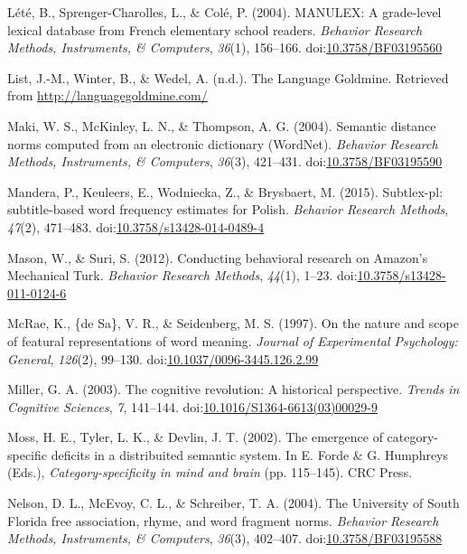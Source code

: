 \documentclass[english,,man]{apa6}
\theoremstyle{definition}
\theoremstyle{definition}
\theoremstyle{definition}
\theoremstyle{remark}
\begin{document}
\leavevmode\hypertarget{ref-Lete2004}{}%
Lété, B., Sprenger-Charolles, L., \& Colé, P. (2004). MANULEX: A
grade-level lexical database from French elementary school readers.
\emph{Behavior Research Methods, Instruments, \& Computers},
\emph{36}(1), 156--166.
doi:\href{https://doi.org/10.3758/BF03195560}{10.3758/BF03195560}

\leavevmode\hypertarget{ref-List}{}%
List, J.-M., Winter, B., \& Wedel, A. (n.d.). The Language Goldmine.
Retrieved from \url{http://languagegoldmine.com/}

\leavevmode\hypertarget{ref-Maki2004}{}%
Maki, W. S., McKinley, L. N., \& Thompson, A. G. (2004). Semantic
distance norms computed from an electronic dictionary (WordNet).
\emph{Behavior Research Methods, Instruments, \& Computers},
\emph{36}(3), 421--431.
doi:\href{https://doi.org/10.3758/BF03195590}{10.3758/BF03195590}

\leavevmode\hypertarget{ref-Mandera2015}{}%
Mandera, P., Keuleers, E., Wodniecka, Z., \& Brysbaert, M. (2015).
Subtlex-pl: subtitle-based word frequency estimates for Polish.
\emph{Behavior Research Methods}, \emph{47}(2), 471--483.
doi:\href{https://doi.org/10.3758/s13428-014-0489-4}{10.3758/s13428-014-0489-4}

\leavevmode\hypertarget{ref-Mason2012}{}%
Mason, W., \& Suri, S. (2012). Conducting behavioral research on
Amazon's Mechanical Turk. \emph{Behavior Research Methods},
\emph{44}(1), 1--23.
doi:\href{https://doi.org/10.3758/s13428-011-0124-6}{10.3758/s13428-011-0124-6}

\leavevmode\hypertarget{ref-McRae1997}{}%
McRae, K., \{de Sa\}, V. R., \& Seidenberg, M. S. (1997). On the nature
and scope of featural representations of word meaning. \emph{Journal of
Experimental Psychology: General}, \emph{126}(2), 99--130.
doi:\href{https://doi.org/10.1037/0096-3445.126.2.99}{10.1037/0096-3445.126.2.99}

\leavevmode\hypertarget{ref-Miller2003}{}%
Miller, G. A. (2003). The cognitive revolution: A historical
perspective. \emph{Trends in Cognitive Sciences}, \emph{7}, 141--144.
doi:\href{https://doi.org/10.1016/S1364-6613(03)00029-9}{10.1016/S1364-6613(03)00029-9}

\leavevmode\hypertarget{ref-Moss2002}{}%
Moss, H. E., Tyler, L. K., \& Devlin, J. T. (2002). The emergence of
category-specific deficits in a distribuited semantic system. In E.
Forde \& G. Humphreys (Eds.), \emph{Category-specificity in mind and
brain} (pp. 115--145). CRC Press.

\leavevmode\hypertarget{ref-Nelson2004}{}%
Nelson, D. L., McEvoy, C. L., \& Schreiber, T. A. (2004). The University
of South Florida free association, rhyme, and word fragment norms.
\emph{Behavior Research Methods, Instruments, \& Computers},
\emph{36}(3), 402--407.
doi:\href{https://doi.org/10.3758/BF03195588}{10.3758/BF03195588}
\end{document}
